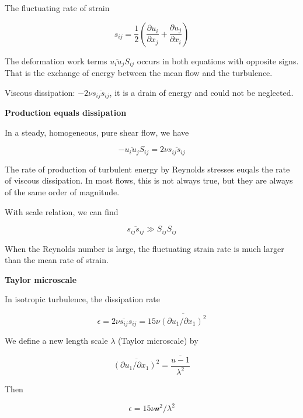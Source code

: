\documentclass{article}
\begin{document}
The fluctuating rate of strain

\begin{equation*}
    s_{ij}=\frac{1}{2}\left(\frac{\partial u_i}{\partial x_j}+\frac{\partial u_j}{\partial x_i}\right)
\end{equation*}

The deformation work terms $\overline{u_i u_j}S_{ij}$ occurs in both equations with opposite signs. That is the exchange of energy between the mean flow and the turbulence.

Viscous dissipation: $-2\nu\overline{s_{ij}s_{ij}}$, it is a drain of energy and could not be neglected.

\textbf{Production equals dissipation}

In a steady, homogeneous, pure shear flow, we have

\begin{equation*}
    -\overline{u_iu_j}S_{ij}=2\nu\overline{s_{ij}s_{ij}}
\end{equation*}

The rate of production of turbulent energy by Reynolds stresses euqals the rate of viscous dissipation. In most flows, this is not always true, but they are always of the same order of magnitude.

With scale relation, we can find

\begin{equation*}
    \overline{s_{ij}s_{ij}}\gg S_{ij} S_{ij}
\end{equation*}

When the Reynolds number is large, the fluctuating strain rate is much larger than the mean rate of strain.

\textbf{Taylor microscale}

In isotropic turbulence, the dissipation rate

\begin{equation*}
    \epsilon=2\nu\overline{s_{ij}}s_{ij}=15\nu\overline{\left(\partial u_1/\partial x_1\right)^2}
\end{equation*}

We define a new length scale $\lambda$ (Taylor microscale) by

\begin{equation*}
    \overline{\left(\partial u_1/\partial x_1\right)^2}=\frac{\overline{u-1}}{\lambda^2}
\end{equation*}

Then

\begin{equation*}
    \epsilon=15\nu\mathcal{u}^2/\lambda^2
\end{equation*}
\end{document}

